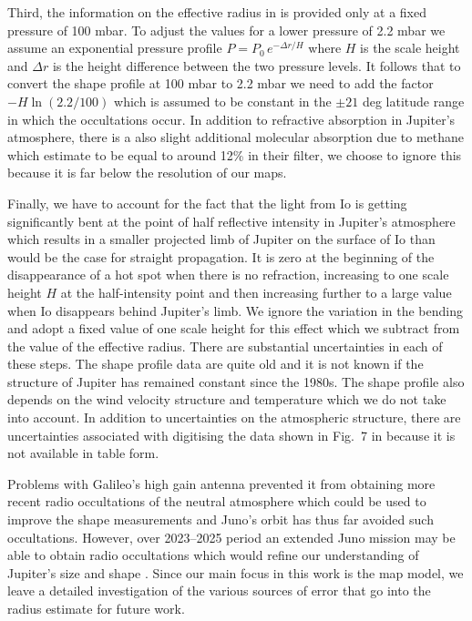 \documentclass[12pt,dvipsnames]{report}
\begin{document}

Third, the information on the effective radius in \citet{1981JGR....86.8721L} is provided only at a fixed pressure of 100 mbar.
To adjust the values for a lower pressure of 2.2 mbar we assume an exponential pressure profile $P=P_0\, e^{-\Delta r/H}$ where $H$ is the scale height and $\Delta r$ is the height difference between the two pressure levels.
It follows that to convert the shape profile at 100 mbar to 2.2 mbar we need to add the factor
$-H\ln(2.2/100)$ which is assumed to be constant in the $\pm 21$ deg latitude range in which the occultations occur.
In addition to refractive absorption in Jupiter's atmosphere, there is a also slight 
additional molecular absorption due to methane which \citet{1990Natur.348..618S} estimate 
to be equal to around 12\% in their filter, we choose to ignore this because it is far 
below the resolution of our maps.

Finally, we have to account for the fact that the light from Io is getting significantly 
bent at the point of half reflective intensity in Jupiter's atmosphere which results in 
a smaller projected limb of Jupiter on the surface of Io than would be the case for 
straight propagation.
It is zero at the beginning of the disappearance of a hot spot when there is no refraction,
 increasing to one scale height $H$ at the half-intensity point and then increasing 
 further to a large value when Io disappears behind Jupiter's limb.
We ignore the variation in the bending and adopt a fixed value of one scale height for 
this effect which we subtract from the value of the effective radius.
There are substantial uncertainties in each of these steps.
The shape profile data are quite old and it is not known if the structure of Jupiter
 has remained constant since the 1980s. 
The shape profile also depends on the wind velocity structure and temperature which we 
do not take into account.
In addition to uncertainties on the atmospheric structure, there are uncertainties 
associated with digitising the data shown in Fig.~7 in \citet{1981JGR....86.8721L} 
because it is not available in table form.

Problems with Galileo's high gain antenna prevented it from obtaining more recent 
radio occultations of the neutral atmosphere which could be used to improve the shape 
measurements and Juno's orbit has thus far avoided such occultations.  
However, over 2023--2025 period an extended Juno mission may be able to obtain 
radio occultations which would refine our understanding of Jupiter's size and shape 
\citep{2020AGUFMP012...07H}.
Since our main focus in this work is the map model, we leave a detailed investigation 
of the various sources of error that go into the radius estimate for future work.
\end{document}
